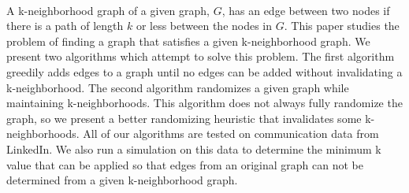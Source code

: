 
\\

\indent A k-neighborhood graph of a given graph, $G$, has an edge between two nodes if there is a path of length $k$ or less between the nodes in $G$. This paper studies the problem of finding a graph that satisfies a given k-neighborhood graph.  We present two algorithms which attempt to solve this problem. The first algorithm greedily adds edges to a graph until no edges can be added without invalidating a k-neighborhood. The second algorithm randomizes a given graph while maintaining k-neighborhoods. This algorithm does not always fully randomize the graph, so we present a better randomizing heuristic that invalidates some k-neighborhoods. All of our algorithms are tested on communication data from LinkedIn. We also run a simulation on this data to determine the minimum k value that can be applied so that edges from an original graph can not be determined from a given k-neighborhood graph. \\